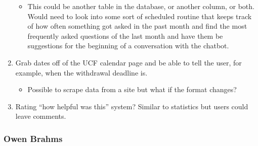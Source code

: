 \documentclass[titlepage, 12pt]{article}
\begin{document}
\begin{enumerate}
    \begin{itemize}
        \item This could be another table in the database, or another column, or both. Would need to look into some sort of scheduled routine that keeps track of how often something got asked in the past month and find the most frequently asked questions of the last month and have them be suggestions for the beginning of a conversation with the chatbot.
    \end{itemize}
    \item Grab dates off of the UCF calendar page and be able to tell the user, for example, when the withdrawal deadline is.
    \begin{itemize}
        \item Possible to scrape data from a site but what if the format changes?
    \end{itemize}
    \item Rating “how helpful was this” system? Similar to statistics but users could leave comments.
\end{enumerate}

\subsubsection{Owen Brahms}
\end{document}
